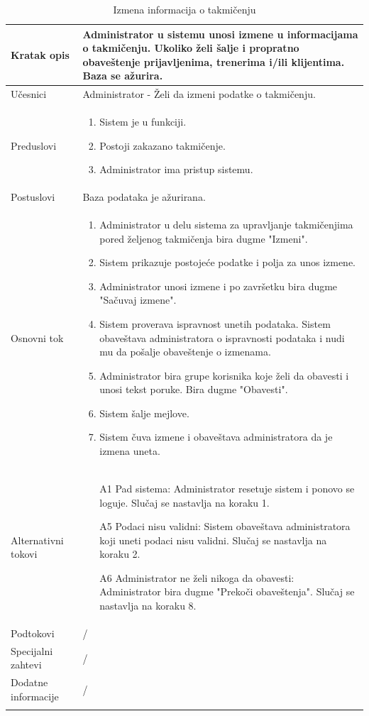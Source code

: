 \documentclass[../../main.tex]{subfiles}
\begin{document}
\begin{longtable}{| p{} | p{} |} 
\hline
    Kratak opis &  Administrator u sistemu unosi izmene u informacijama o takmičenju. Ukoliko želi šalje i propratno obaveštenje prijavljenima, trenerima i/ili klijentima. Baza se ažurira.\\ 
\hline    
    Učesnici & Administrator - Želi da izmeni podatke o takmičenju. \\
\hline
   Preduslovi & \begin{enumerate}
       \item Sistem je u funkciji.
       \item Postoji zakazano takmičenje.
       \item Administrator ima pristup sistemu.
   \end{enumerate}\\
\hline  
    Postuslovi & Baza podataka je ažurirana.\\
\hline
    Osnovni tok & \begin{enumerate}
        \item Administrator u delu sistema za upravljanje takmičenjima pored željenog takmičenja bira dugme "Izmeni".
        \item Sistem prikazuje postojeće podatke i polja za unos izmene.
        \item Administrator unosi izmene i po završetku bira dugme "Sačuvaj izmene".
        \item Sistem proverava ispravnost unetih podataka. Sistem obaveštava administratora o ispravnosti podataka i nudi mu da pošalje obaveštenje o izmenama.
        \item Administrator bira grupe korisnika koje želi da obavesti i unosi tekst poruke. Bira dugme "Obavesti".
        \item Sistem šalje mejlove. 
        \item Sistem čuva izmene i obaveštava administratora da je izmena uneta.
    \end{enumerate}\\
\hline
    Alternativni tokovi & \begin{itemize}
        \item[A1] Pad sistema: Administrator resetuje sistem i ponovo se loguje. Slučaj se nastavlja na koraku 1.
        \item[A5] Podaci nisu validni: Sistem obaveštava administratora koji uneti podaci nisu validni. Slučaj se nastavlja na koraku 2.
        \item[A6] Administrator ne želi nikoga da obavesti: Administrator bira dugme "Prekoči obaveštenja". Slučaj se nastavlja na koraku 8.
    \end{itemize}\\
\hline
    Podtokovi & /\\
\hline
    Specijalni zahtevi & /\\
\hline
    Dodatne informacije & /\\
\hline
\caption{Izmena informacija o takmičenju} %
\end{longtable}
\end{document}
